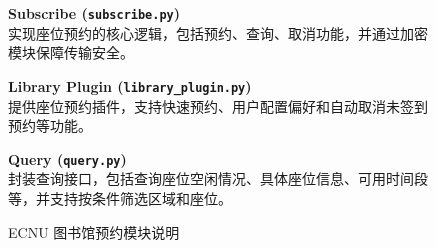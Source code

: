 \documentclass[14pt,a4paper,UTF8,twoside]{article}
\begin{document}
\begin{figure}[H]
{\begin{minipage}[H]{0.45\textwidth}
        \textbf{Subscribe (\texttt{subscribe.py})}\\
        实现座位预约的核心逻辑，包括预约、查询、取消功能，并通过加密模块保障传输安全。\\
        \vspace{0.25cm}

        \textbf{Library Plugin (\texttt{library\_plugin.py})}\\
        提供座位预约插件，支持快速预约、用户配置偏好和自动取消未签到预约等功能。\\
        \vspace{0.25cm}

        \textbf{Query (\texttt{query.py})}\\
        封装查询接口，包括查询座位空闲情况、具体座位信息、可用时间段等，并支持按条件筛选区域和座位。\\
    \end{minipage}
    }
    \caption{ECNU 图书馆预约模块说明}
    \label{fig:directory_structure}
\end{figure}

\newpage{}
\end{document}
